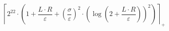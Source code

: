 \[\left\lceil 2^{22} \cdot \left(1 + \frac{L \cdot R}{\varepsilon} + \left(\frac{\sigma}{\varepsilon}\right)^{2} \cdot \left(\log\left(2 + \frac{L \cdot R}{\varepsilon}\right)\right)^{2}\right) \right\rceil_{+}\]
